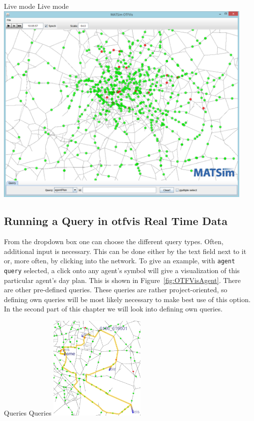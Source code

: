 \createfigure%
{Live mode}%
{Live mode}%
{\label{fig:OTFVisLive}}%
{\includegraphics[width=0.95\textwidth, angle=0]{extending/figures/otfvis/image04.png}}%
{}

\subsection{Running a Query in \gls{otfvis} Real Time Data}
From the dropdown box one can choose the different query types. 
Often, additional input is necessary. This can be done either by the text field next to it or, more often, by clicking into the network. 
To give an example, with \lstinline|agent query| selected, a click onto any agent's symbol will give a visualization of this particular agent's day plan. 
This is shown in Figure~\ref{fig:OTFVisAgent}. There are other pre-defined queries. 
These queries are rather project-oriented, so defining own queries will be most likely necessary to make best use of this option. 
In the second part of this chapter we will look into defining own queries.

\createfigure%
{Queries}%
{Queries}%
{\label{fig:OTFVisAgent}}%
{\includegraphics[width=0.35\textwidth, angle=0]{extending/figures/otfvis/image08.png}}%
{}

